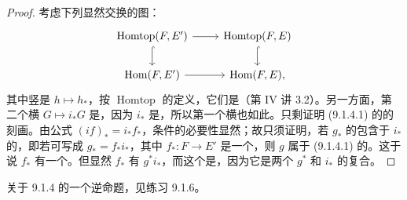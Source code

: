 \begin{proof}
考虑下列显然交换的图：
\[
\begin{tikzcd}
\operatorname{Homtop}(F,E')\arrow[r]\arrow[d,hook]&\operatorname{Homtop}(F,E)\arrow[d,hook]\\
\operatorname{Hom}(F,E')\arrow[r]&\operatorname{Hom}(F,E),
\end{tikzcd}
\]
其中竖是 $h\mapsto h_*$，按 $\operatorname{Homtop}$ 的定义，它们是（第 IV 讲 3.2）。另一方面，第二个横 $G\mapsto i_*G$ 是，因为 $i_*$ 是，所以第一个横也如此。只剩证明 (9.1.4.1) 的的刻画。由公式 $(if)_*=i_*f_*$，条件的必要性显然；故只须证明，若 $g_*$ 的包含于 $i_*$ 的，即若可写成 $g_*=f_*i_*$，其中 $f_*:F\to E'$ 是一个，则 $g$ 属于 (9.1.4.1) 的。这于说 $f_*$ 有一个。但显然 $f_*$ 有 $g^*i_*$，而这个是，因为它是两个 $g^*$ 和 $i_*$ 的复合。
\end{proof}
关于 9.1.4 的一个逆命题，见练习 9.1.6。


